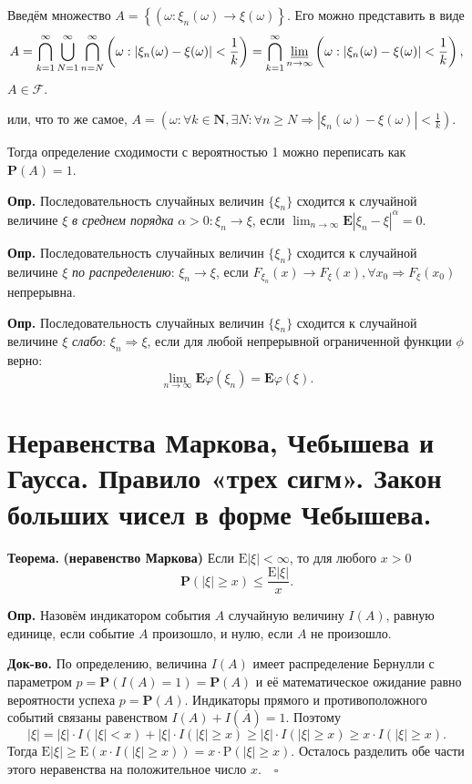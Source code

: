 \documentclass[oneside,final,14pt]{extreport}
\newcommand\mydef{{\bf Опр.}}
\newcommand\myth{{\bf Теорема.}}
\newcommand\myqed{{\bf Док-во.}}
\newcommand\myprob[1]{{\mathbf{P}(#1)}}
\theoremstyle{definition}
\begin{document}
Введём множество $A=\left\{\left(\omega: \xi_{n}(\omega) \rightarrow \xi(\omega)\right\}\right.$. Его можно представить в виде 
$$A=\bigcap_{k=1}^{\infty} \bigcup_{N=1}^{\infty} \bigcap_{n=N}^{\infty}\left(\omega:\left|\xi_{n}(\omega)-\xi(\omega)\right|<\frac{1}{k}\right)=\bigcap_{k=1}^{\infty} \varliminf_{n \rightarrow \infty}\left(\omega:\left|\xi_{n}(\omega)-\xi(\omega)\right|<\frac{1}{k}\right),$$ $A \in \mathcal{F}.$

или, что то же самое, $A=\left(\omega: \forall k \in \mathbf{N}, \exists N: \forall n \geq N \Rightarrow\left|\xi_{n}(\omega)-\xi(\omega)\right|<\frac{1}{k}\right).$

Тогда определение сходимости с вероятностью 1 можно переписать как $\myprob{A} = 1.$

\mydef{} Последовательность случайных величин $\{ \xi_n \}$ сходится к случайной величине $\xi$ {\it в среднем порядка} $\alpha > 0: \xi_n \rightarrow \xi$, если $\lim _{n \rightarrow \infty} \mathbf{E}\left|\xi_{n}-\xi\right|^{\alpha}=0.$

\mydef{} Последовательность случайных величин $\{ \xi_n \}$ сходится к случайной величине $\xi$ {\it по распределению}: $\xi_n \rightarrow \xi$, если $F_{\xi_n}(x) \rightarrow F_\xi(x), \forall x_0 \Rightarrow F_\xi(x_0)$ непрерывна.

\mydef{} Последовательность случайных величин $\{ \xi_n \}$ сходится к случайной величине $\xi$ {\it слабо}: $\xi_n \Rightarrow \xi$, если для любой непрерывной ограниченной функции $\phi$ верно:
$$\lim _{n \rightarrow \infty} \mathbf{E} \varphi\left(\xi_{n}\right)=\mathbf{E} \varphi(\xi).$$

\section{Неравенства Маркова, Чебышева и Гаусса. Правило «трех сигм». Закон больших чисел в форме Чебышева.}

\myth{} \textbf{(неравенство Маркова)} Если $\mathrm{E}|\xi| < \infty$, то для любого $x > 0$
$$\myprob{|\xi| \geqslant x} \leqslant \frac{\mathrm{E}|\xi|}{x}.$$

\mydef{}  Назовём индикатором события $A$ случайную величину $I(A)$, равную единице, если событие $A$ произошло, и нулю, если $A$ не произошло.

\myqed{} По определению, величина $I(A)$ имеет распределение Бернулли с параметром $p = \myprob{I(A) = 1} = \myprob{A}$ и её математическое ожидание равно вероятности успеха $p = \myprob{A}.$ Индикаторы прямого и противоположного событий связаны равенством $I(A) + I(\overline{A}) = 1.$ Поэтому
$$|\xi|=|\xi| \cdot I(|\xi|<x)+|\xi| \cdot I(|\xi| \geqslant x) \geqslant|\xi| \cdot I(|\xi| \geqslant x) \geqslant x \cdot I(|\xi| \geqslant x).$$
Тогда $\mathrm{E}|\xi| \geqslant \mathrm{E}(x \cdot I(|\xi| \geqslant x))=x \cdot \mathrm{P}(|\xi| \geqslant x)$. Осталось разделить обе части этого неравенства на положительное число $x$. $~~~\square$
\end{document}
